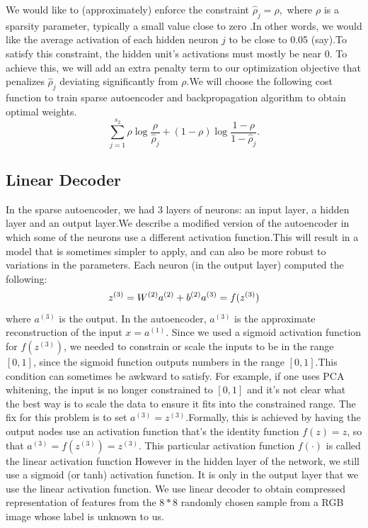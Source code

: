 \documentclass[11pt,twocolumn,letterpaper]{article}
\begin{document}
We would like to (approximately) enforce the constraint
$ \hat\rho_j = \rho,$
where $\textstyle \rho$ is a sparsity parameter, typically a small value close to zero
.In other words, we would like the average activation
of each hidden neuron $\textstyle j$ to be close to 0.05 (say).To satisfy this
constraint, the hidden unit's activations must mostly be near 0.
To achieve this, we will add an extra penalty term to our optimization objective that
penalizes $\textstyle \hat\rho_j$ deviating significantly from $\textstyle \rho$.We will choose the following cost function to train sparse autoencoder and backpropagation algorithm to obtain optimal weights.
$$
\sum_{j=1}^{s_2} \rho \log \frac{\rho}{\hat\rho_j} + (1-\rho) \log \frac{1-\rho}{1-\hat\rho_j}.
$$
\subsection{Linear Decoder}
In the sparse autoencoder, we had 3 layers of neurons: an input layer, a hidden layer and an output layer.We describe a modified version of the autoencoder in which some of the neurons use a different activation function.This will result in a model that is sometimes simpler to apply, and can also be more robust to variations in the parameters. 
Each neuron (in the output layer) computed the following:
$$
z^{(3)} = W^{(2)} a^{(2)} + b^{(2)} \\
a^{(3)} = f(z^{(3)})
$$
where $a^{(3)}$ is the output. In the autoencoder, $a^{(3)}$ is the approximate reconstruction of the input $x = a^{(1)}$.
Since we used a sigmoid activation function for $f(z^{(3)})$, we needed to constrain or scale the inputs to be in the range $[0,1]$, 
since the sigmoid function outputs numbers in the range $[0,1]$.This condition can sometimes be awkward to satisfy. For example, if one uses PCA whitening, the input is no longer constrained to $[0,1]$ and it's not clear what the best way is to scale the data to ensure it fits into the constrained range.
The fix for this problem is to set $a^{(3)} = z^{(3)}$.Formally, this is achieved by having the output nodes use an activation function that's the identity function $f(z) = z$, so that $a^{(3)} = f(z^{(3)}) = z^{(3)}$. 
This particular activation function $f(\cdot)$ is called the linear activation function However in the hidden layer of the network, we still use a sigmoid (or tanh) activation function.
It is only in the output layer that we use the linear activation function. 
We use linear decoder to obtain compressed representation of features from the $8 * 8$ randomly chosen sample from a RGB image whose label is unknown to us.
 
\end{document}
